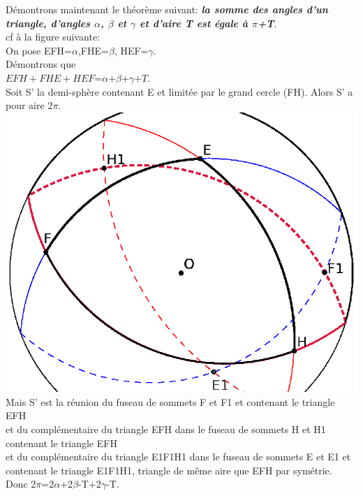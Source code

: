 \documentclass[a4paper, 12pt, twoside]{book}
\begin{document}
     
    Démontrons maintenant le théorème suivant: \textit{\textbf{la somme des angles d'un triangle, d'angles $\alpha$, $\beta$ et $\gamma$ et d'aire T est égale à $\pi$+T}}.\\
    
    
    cf à la figure suivante:\\
    
     On pose  EFH=$\alpha$,FHE=$\beta$, HEF=$\gamma$.\\
     
   Démontrons que\\ $EFH+FHE+HEF$=$\alpha$+$\beta$+$\gamma$+$T$. \\    
 
 Soit S' la demi-sphère contenant E et limitée par le grand cercle (FH). Alors S' a pour aire 2$\pi$.\\   
  \includegraphics[scale=0.7]{figures/sphre5ter.eps} \\   
     
 


Mais S' est la réunion du fuseau de sommets F et F1 et contenant le triangle EFH  \\
et du complémentaire du triangle EFH dans le fuseau de sommets H et H1 contenant le triangle EFH  \\
et du complémentaire du  triangle E1F1H1 dans le fuseau de sommets E et E1 et contenant le triangle E1F1H1, triangle de même aire que  EFH par symétrie.\\

Donc 2$\pi$=2$\alpha$+2$\beta$-T+2$\gamma$-T.
\end{document}
